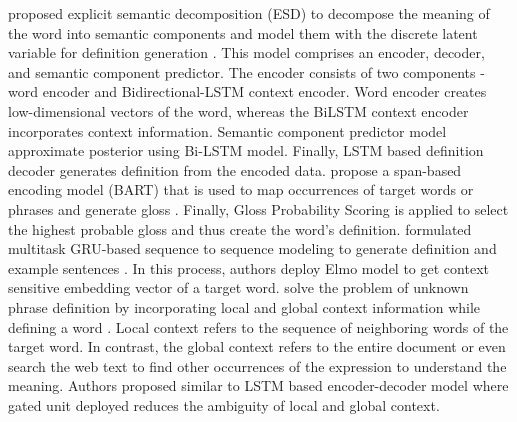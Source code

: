 \citeauthor*{li_explicit_2020} proposed explicit semantic decomposition (ESD) to decompose the meaning of the word into semantic components and model them with the discrete latent variable for definition generation \cite{li_explicit_2020}. This model comprises an encoder, decoder, and semantic component predictor. The encoder consists of two components - word encoder and Bidirectional-LSTM context encoder. Word encoder creates low-dimensional vectors of the word, whereas the BiLSTM context encoder incorporates context information. Semantic component predictor model approximate posterior using Bi-LSTM model. Finally, LSTM based definition decoder generates definition from the encoded data. \citeauthor*{bevilacqua_generationary_2020} propose a span-based encoding
model (BART) that is used to map occurrences of target words or phrases and generate gloss \cite{bevilacqua_generationary_2020}. Finally, Gloss Probability Scoring is applied to select the highest probable gloss and thus create the word's definition. \citeauthor*{zhang_improving_2020} formulated multitask GRU-based sequence to sequence modeling to generate definition and example sentences \cite{zhang_improving_2020}. In this process, authors deploy Elmo model to get context sensitive embedding vector of a target word. \citeauthor*{ishiwatari_learning_2019} solve the problem of unknown phrase definition by incorporating local and global context information while defining a word \cite{ishiwatari_learning_2019}. Local context refers to the sequence of neighboring words of the target word. In contrast, the global context refers to the entire document or even search the web text to find other occurrences of the expression to understand the meaning. Authors proposed similar to LSTM based encoder-decoder model where gated unit deployed reduces the ambiguity of local and global context.



